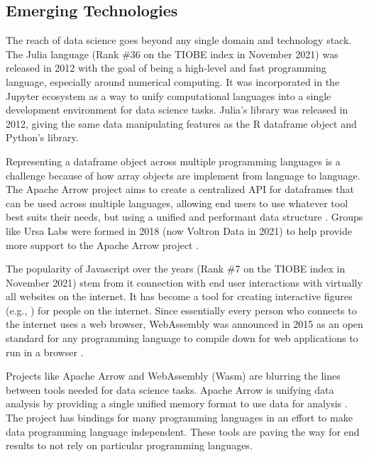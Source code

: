 \documentclass[010-intro.tex]{subfiles}
\begin{document}
\subsection{Emerging Technologies}

    The reach of data science goes beyond any single domain and technology stack.
    The Julia language (Rank \#36 on the TIOBE index in November 2021)
    was released in 2012 with the goal of being a high-level and fast programming language,
    especially around numerical computing.
    It was incorporated in the Jupyter ecosystem as a way to unify computational languages into a single
    development environment for data science tasks.
    Julia's  library was released in 2012, giving the same data manipulating
    features as the R dataframe object and Python's  library.

    Representing a dataframe object across multiple programming languages is a challenge because of
    how array objects are implement from language to language.
    The Apache Arrow project aims to create a centralized API for dataframes that can be used across multiple languages,
    allowing end users to use whatever tool best suits their needs,
    but using a unified and performant data structure
    \cite{ApacheArrow}.
    Groups like Ursa Labs were formed in 2018 (now Voltron Data in 2021) to help provide
    more support to the Apache Arrow project
    \cite{UrsaLabs, VoltronData}.

    The popularity of Javascript over the years (Rank \#7 on the TIOBE index in November 2021)
    stem from it connection with end user interactions with
    virtually all websites on the internet.
    It has become a tool for creating interactive figures (e.g., ) for people on the internet.
    Since essentially every person who connects to the internet uses a web browser,
    WebAssembly was announced in 2015 as an open standard for any programming language
    to compile down for web applications to run in a browser
    \cite{WebAssembly}.

    Projects like Apache Arrow and WebAssembly (Wasm) are blurring the lines between tools needed for data science tasks.
    Apache Arrow is unifying data analysis by providing a single unified memory format to use data for analysis
    \cite{ApacheArrow}.
    The project has bindings for many programming languages in an effort to make data programming language independent.
    These tools are paving the way for end results to not rely on particular programming languages.
\end{document}
